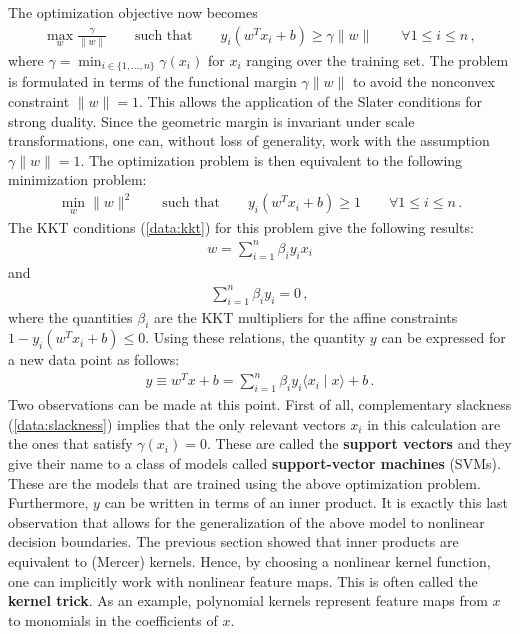     The optimization objective now becomes
    \begin{gather}
        \max_w\frac{\gamma}{\|w\|} \qquad\text{such that}\qquad  y_i(w^Tx_i+b)\geq\gamma\|w\|\qquad\forall 1\leq i\leq n\,,
    \end{gather}
    where $\gamma=\min_{i\in\{1,\ldots,n\}}\gamma(x_i)$ for $x_i$ ranging over the training set. The problem is formulated in terms of the functional margin $\gamma\|w\|$ to avoid the nonconvex constraint $\|w\|=1$. This allows the application of the Slater conditions for strong duality. Since the geometric margin is invariant under scale transformations, one can, without loss of generality, work with the assumption $\gamma\|w\|=1$. The optimization problem is then equivalent to the following minimization problem:
    \begin{gather}
        \min_w\|w\|^2 \qquad\text{such that}\qquad y_i(w^Tx_i+b)\geq1\qquad\forall 1\leq i\leq n\,.
    \end{gather}
    The KKT conditions (\cref{data:kkt}) for this problem give the following results:
    \begin{gather}
        w = \sum_{i=1}^n\beta_iy_ix_i
    \end{gather}
    and
    \begin{gather}
        \sum_{i=1}^n\beta_iy_i = 0\,,
    \end{gather}
    where the quantities $\beta_i$ are the KKT multipliers for the affine constraints $1-y_i(w^Tx_i+b)\leq0$. Using these relations, the quantity $y$ can be expressed for a new data point as follows:
    \begin{gather}
        y \equiv w^Tx + b = \sum_{i=1}^n\beta_iy_i\langle x_i\mid x \rangle + b\,.
    \end{gather}
    Two observations can be made at this point. First of all, complementary slackness (\cref{data:slackness}) implies that the only relevant vectors $x_i$ in this calculation are the ones that satisfy $\gamma(x_i)=0$. These are called the \textbf{support vectors} and they give their name to a class of models called \textbf{support-vector machines} (SVMs). These are the models that are trained using the above optimization problem. Furthermore, $y$ can be written in terms of an inner product. It is exactly this last observation that allows for the generalization of the above model to nonlinear decision boundaries. The previous section showed that inner products are equivalent to (Mercer) kernels. Hence, by choosing a nonlinear kernel function, one can implicitly work with nonlinear feature maps. This is often called the \textbf{kernel trick}. As an example, polynomial kernels represent feature maps from $x$ to monomials in the coefficients of $x$.

